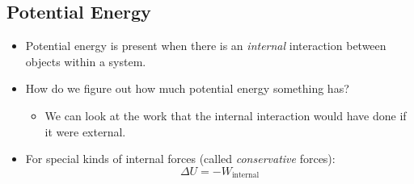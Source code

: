 \documentclass[]{article}
\begin{document}
\begin{PresentSpace}
\vspace{-10pt}
\section*{Potential Energy}
\vspace{-10pt}
\begin{itemize}
	\item Potential energy is present when there is an \textit{internal} interaction between objects within a system.
	\item How do we figure out how much potential energy something has?
	\begin{itemize}
		\item We can look at the work that the internal interaction would have done if it were external.
	\end{itemize}
	\item For special kinds of internal forces (called \textit{conservative} forces):
	\[
	\Delta U = -W_{\text{internal}}
	\]
\end{itemize}
\end{PresentSpace}
\newpage
\begin{TeacherMargin}
\begin{center}
\end{center}
\end{TeacherMargin}
\end{document}
